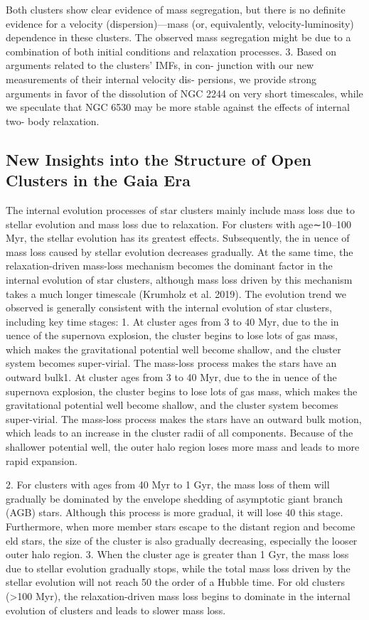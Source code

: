\documentclass[../main.tex]{subfiles}
\begin{document}
{Both clusters show clear evidence of mass segregation, but
there is no definite evidence for a velocity (dispersion)—mass (or,
equivalently, velocity-luminosity) dependence in these clusters.
The observed mass segregation might be due to a combination of
both initial conditions and relaxation processes.
3. Based on arguments related to the clusters’ IMFs, in con-
junction with our new measurements of their internal velocity dis-
persions, we provide strong arguments in favor of the dissolution
of NGC 2244 on very short timescales, while we speculate that
NGC 6530 may be more stable against the effects of internal two-
body relaxation.

\subsection{New Insights into the Structure of Open Clusters in the Gaia Era}


The internal evolution processes of star clusters mainly
include mass loss due to stellar evolution and mass loss due to
relaxation. For clusters with age∼10–100 Myr, the stellar
evolution has its greatest effects. Subsequently, the in uence of
mass loss caused by stellar evolution decreases gradually. At
the same time, the relaxation-driven mass-loss mechanism
becomes the dominant factor in the internal evolution of star
clusters, although mass loss driven by this mechanism takes a
much longer timescale (Krumholz et al. 2019). The evolution
trend we observed is generally consistent with the internal
evolution of star clusters, including key time stages:
1. At cluster ages from 3 to 40 Myr, due to the in uence of
the supernova explosion, the cluster begins to lose lots of gas
mass, which makes the gravitational potential well become
shallow, and the cluster system becomes super-virial. The
mass-loss process makes the stars have an outward bulk1. At cluster ages from 3 to 40 Myr, due to the in uence of
the supernova explosion, the cluster begins to lose lots of gas
mass, which makes the gravitational potential well become
shallow, and the cluster system becomes super-virial. The
mass-loss process makes the stars have an outward bulk motion, which leads to an increase in the cluster radii of all
components. Because of the shallower potential well, the outer
halo region loses more mass and leads to more rapid expansion.

2. For clusters with ages from 40 Myr to 1 Gyr, the mass loss
of them will gradually be dominated by the envelope shedding of
asymptotic giant branch (AGB) stars. Although this process is
more gradual, it will lose 40%
this stage. Furthermore, when more member stars escape to the
distant region and become eld stars, the size of the cluster is
also gradually decreasing, especially the looser outer halo region.
3. When the cluster age is greater than 1 Gyr, the mass loss due
to stellar evolution gradually stops, while the total mass loss
driven by the stellar evolution will not reach 50%
the order of a Hubble time. For old clusters (>100 Myr), the
relaxation-driven mass loss begins to dominate in the internal
evolution of clusters and leads to slower mass loss.


}
\end{document}
